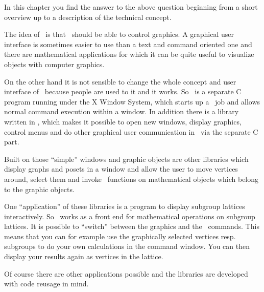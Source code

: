 
In this chapter you find the answer to the above question beginning from a
short overview up to a description of the technical concept.


The idea of \XGAP~is that \GAP~should be able to control graphics. A
graphical user interface is sometimes easier to use than a text and
command oriented one and there are mathematical applications for which it
can be quite useful to visualize objects with computer graphics.

On the other hand it is not sensible to change the whole concept and user
interface of \GAP~because people are used to it and it works. So \XGAP~is a 
separate C program running under the X Window System, which starts up a
\GAP~job and allows normal command execution within a window. In addition
there is a library written in \GAP, which makes it possible to open new
windows, display graphics, control menus and do other graphical user
communication in \GAP~via the separate C part.

Built on those ``simple'' windows and graphic objects are other libraries
which display graphs and posets in a window and allow the user to move
vertices around, select them and invoke \GAP~functions on mathematical
objects which belong to the graphic objects.

One ``application'' of these libraries is a program to display subgroup
lattices interactively. So \XGAP~works as a front end for mathematical
operations on subgroup lattices. It is possible to ``switch'' between the
graphics and the \GAP~commands. This means that you can for example use the 
graphically selected vertices resp. subgroups to do your own calculations
in the command window. You can then display your results again as vertices
in the lattice.

Of course there are other applications possible and the libraries are
developed with code reusage in mind.






